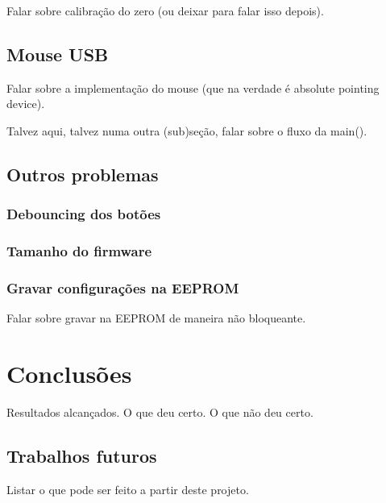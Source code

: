 \documentclass[brazil,pagestart=firstchapter]{abnt}
\begin{document}
Falar sobre calibração do zero (ou deixar para falar isso depois).

\section{Mouse USB\label{sec:mouse}}

Falar sobre a implementação do mouse (que na verdade é absolute pointing
device).

Talvez aqui, talvez numa outra (sub)seção, falar sobre o fluxo da main().

\section{Outros problemas\label{sec:outros_problemas}}

\subsection{Debouncing dos botões\label{sec:debouncing}}

\subsection{Tamanho do firmware\label{sec:firmware_size}}

\subsection{Gravar configurações na EEPROM\label{sec:eeprom}}

Falar sobre gravar na EEPROM de maneira não bloqueante.

\chapter{Conclusões\label{cap:conclusoes}}

Resultados alcançados. O que deu certo. O que não deu certo.

\section{Trabalhos futuros\label{sec:trabalhos_futuros}}

Listar o que pode ser feito a partir deste projeto.







\anexo
\end{document}
